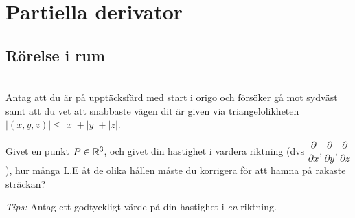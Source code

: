 \section{Partiella derivator}
\subsection{Rörelse i rum}\hfill\\

\noindent Antag att du är på upptäcksfärd med start i origo och försöker gå mot sydväst samt att du vet att snabbaste vägen dit är given via triangelolikheten $\left|(x,y,z)\right|\leq\left|x\right| + \left|y\right|+ \left|z\right|$.
\par\bigskip
\noindent Givet en punkt $P\in\mathbb{R}^3$, och givet din hastighet i vardera riktning (dvs $\dfrac{\partial}{\partial x}, \dfrac{\partial}{\partial y}, \dfrac{\partial}{\partial z}$), hur många L.E åt de olika hållen måste du korrigera för att hamna på rakaste sträckan?
\par\bigskip
\noindent\textit{Tips:} Antag ett godtyckligt värde på din hastighet i \textit{en} riktning. 

